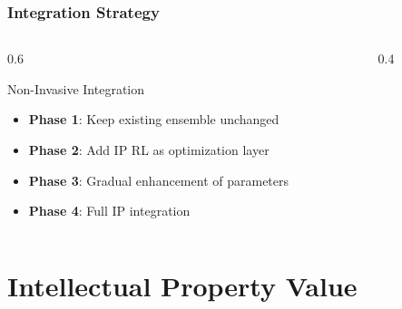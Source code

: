 \documentclass{beamer}
\begin{document}
\begin{frame}
\frametitle{Integration Strategy}
\begin{columns}
\begin{column}{0.6\textwidth}
\begin{block}{Non-Invasive Integration}
\begin{itemize}
\item \textbf{Phase 1}: Keep existing ensemble unchanged
\item \textbf{Phase 2}: Add IP RL as optimization layer
\item \textbf{Phase 3}: Gradual enhancement of parameters
\item \textbf{Phase 4}: Full IP integration
\end{itemize}
\end{block}
\end{column}
\begin{column}{0.4\textwidth}
\begin{center}
\end{center}
\end{column}
\end{columns}
\end{frame}

\section{Intellectual Property Value}
\end{document}

